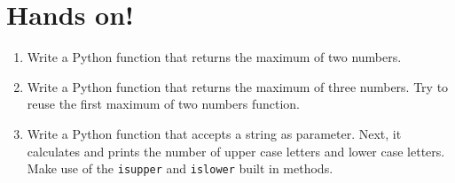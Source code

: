 \documentclass[aspectratio=1610,slidestop]{beamer}
\begin{document}
\section{Hands on!}
\begin{pframe}
 \vspace{-0.5cm}
 \begin{enumerate}
  \item Write a Python function that returns the maximum of two numbers.
  \item Write a Python function that returns the maximum of three numbers.
  Try to reuse the first maximum of two numbers function.
  \item Write a Python function that accepts a string as parameter.
  Next, it calculates and prints the number of upper case letters and lower
  case letters. Make use of the \texttt{isupper} and
  \texttt{islower} built in methods.
 \end{enumerate}
\end{pframe}


\end{document}
